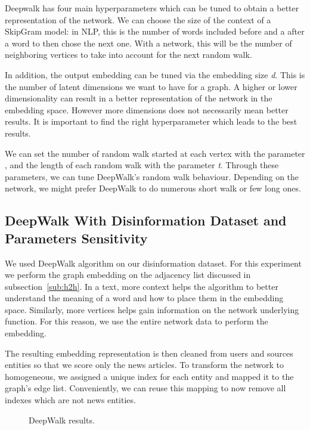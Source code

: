 Deepwalk has four main hyperparameters which can be tuned to obtain a better representation of the network.
We can choose the size of the context of a SkipGram model: in NLP, this is the number of words included before and a after a word to then chose the next one.
With a network, this will be the number of neighboring vertices to take into account for the next random walk.

In addition, the output embedding can be tuned via the embedding size \textit{d}.
This is the number of latent dimensions we want to have for a graph.
A higher or lower dimensionality can result in a better representation of the network in the embedding space.
However more dimensions does not necessarily mean better results.
It is important to find the right hyperparameter which leads to the best results.

We can set the number of random walk started at each vertex with the parameter \textit{\gamma}, and the length of each random walk with the parameter \textit{t}.
Through these parameters, we can tune DeepWalk's random walk behaviour. 
Depending on the network, we might prefer DeepWalk to do numerous short walk or few long ones.

\subsection{DeepWalk With Disinformation Dataset and Parameters Sensitivity}

We used DeepWalk algorithm on our disinformation dataset.
For this experiment we perform the graph embedding on the adjacency list discussed in subsection~\ref{sub:h2h}.
In a text, more context helps the algorithm to better understand the meaning of a word and how to place them in the embedding space.
Similarly, more vertices helps gain information on the network underlying function.
For this reason, we use the entire network data to perform the embedding.

The resulting embedding representation is then cleaned from users and sources entities so that we score only the news articles.
To transform the network to homogeneous, we assigned a unique index for each entity and mapped it to the graph's edge list.
Conveniently, we can reuse this mapping to now remove all indexes which are not news entities.

\begin{figure}[h!]
    \centering
    \begin{subfigure}[b]{0.49\textwidth}
        \centering
        \scalebox{.5}{}
        \label{fig:deepwalk:representation window size}
    \end{subfigure}
    \hfill
    \begin{subfigure}[b]{0.49\textwidth}
        \centering
        \scalebox{.5}{}
        \label{fig:deepwalk:number walk length}
    \end{subfigure}
    \caption{DeepWalk results.}
    \label{fig:deepwalk:plots}
\end{figure}

